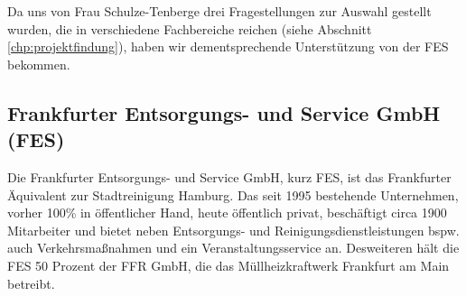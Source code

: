         Da uns von Frau Schulze-Tenberge drei Fragestellungen zur Auswahl gestellt wurden, die in verschiedene Fachbereiche reichen (siehe Abschnitt\,\ref{chp:projektfindung}), haben wir dementsprechende Unterstützung von der FES bekommen.


    \subsection{Frankfurter Entsorgungs- und Service GmbH (FES)}

        Die Frankfurter Entsorgungs- und Service GmbH, kurz FES, ist das Frankfurter Äquivalent zur Stadtreinigung Hamburg. 
        Das seit 1995 bestehende Unternehmen, vorher 100\% in öffentlicher Hand, heute öffentlich privat, beschäftigt circa 1900 Mitarbeiter und bietet neben Entsorgungs- und Reinigungsdienstleistungen bspw. auch Verkehrsmaßnahmen und ein Veranstaltungsservice an.
        Desweiteren hält die FES 50 Prozent der FFR GmbH, die das Müllheizkraftwerk Frankfurt am Main betreibt.
